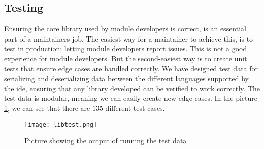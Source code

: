 \subsection{Testing}

Ensuring the core library used by module developers is correct, is an essential
part of a maintainers job. The easiest way for a maintainer to achieve this, is
to test in production; letting module developers report issues. This is not a
good experience for module developers. But the second-easiest way is to create
unit tests that ensure edge cases are handled correctly. We have designed test
data for serializing and deserializing data between the different languages
supported by the \gls*{ide}, ensuring that any library developed can be
verified to work correctly. The test data is modular, meaning we can easily
create new edge cases. In the picture \ref{pic:libTest}, we can see that there
are $135$ different test cases.

\begin{figure}
  \centering
  \texttt{[image: libtest.png]}
  \caption{Picture showing the output of running the test data}
  \label{pic:libTest}
\end{figure}
